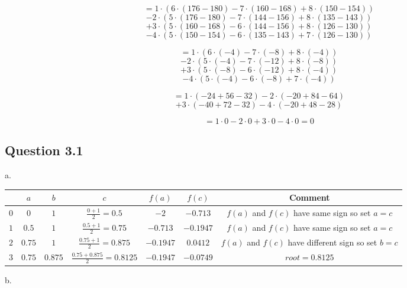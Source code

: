 \documentclass[12pt]{article}
\begin{document}
\begin{center}
$$
= 1 \cdot (
6 \cdot (176 - 180)
- 7 \cdot (160 - 168)
+ 8 \cdot (150 - 154)
)
$$
$$
- 2 \cdot (
5 \cdot (176 - 180)
- 7 \cdot (144 - 156)
+ 8 \cdot (135 - 143)
)
$$
$$
+ 3 \cdot (
5 \cdot (160 - 168)
- 6 \cdot (144 - 156)
+ 8 \cdot (126 - 130)
)
$$
$$
- 4 \cdot (
5 \cdot (150 - 154)
- 6 \cdot (135 - 143)
+ 7 \cdot (126 - 130)
)
$$

$$ = 1 \cdot (6 \cdot (-4) - 7 \cdot (-8) + 8 \cdot (-4)) $$
$$ - 2 \cdot (5 \cdot (-4) - 7 \cdot (-12) + 8 \cdot (-8)) $$
$$ + 3 \cdot (5 \cdot (-8) - 6 \cdot (-12) + 8 \cdot (-4)) $$
$$ - 4 \cdot (5 \cdot (-4) - 6 \cdot (-8) + 7 \cdot (-4)) $$

$$ = 1 \cdot (-24 + 56 - 32) - 2 \cdot (-20 + 84 - 64) $$
$$ + 3 \cdot (-40 + 72 - 32) - 4 \cdot (-20 + 48 - 28) $$

$$ = 1 \cdot 0 - 2 \cdot 0 + 3 \cdot 0 - 4 \cdot 0 = 0 $$

\end{center}

\subsection*{Question 3.1}

\noindent a.

\begin{center}
    \begin{tabular}{|c||c|c|c|c|c|c|}
        \hline
        & $a$ & $b$ & $c$ & $f(a)$ & $f(c)$ & Comment \\
        \hline
        $0$ & $0$ & $1$ & $\frac{0+1}{2} = 0.5$ & $-2$ & $-0.713$ & \makecell{$f(a)$ and $f(c)$ have same sign\\so set $a=c$} \\
        $1$ & $0.5$ & $1$ & $\frac{0.5+1}{2} = 0.75$ & $-0.713$ & $-0.1947$ & \makecell{$f(a)$ and $f(c)$ have same sign\\so set $a=c$} \\
        $2$ & $0.75$ & $1$ & $\frac{0.75+1}{2} = 0.875$ & $-0.1947$ & $0.0412$ & \makecell{$f(a)$ and $f(c)$ have different\\sign so set $b=c$} \\
        $3$ & $0.75$ & $0.875$ & $\frac{0.75+0.875}{2} = 0.8125$ & $-0.1947$ & $-0.0749$ & $root = 0.8125$ \\
        \hline
    \end{tabular}
\end{center}

\noindent b.
\end{document}
